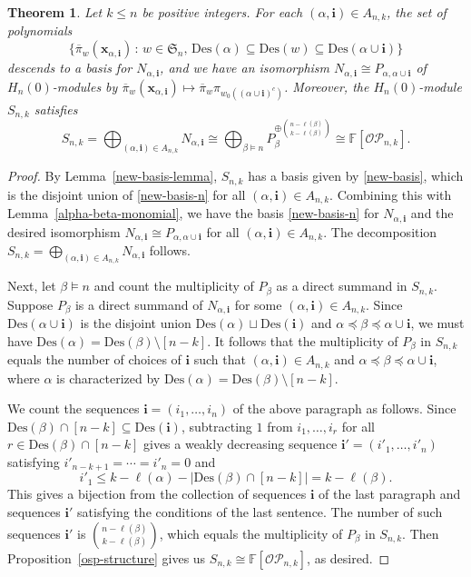 \documentclass[10pt]{amsart}
\newtheorem{theorem}{Theorem}[section]
\theoremstyle{definition}
\newcommand{\Des}{{\mathrm {Des}}}
\newcommand{\symm}{{\mathfrak{S}}}
\newcommand{\OP}{{\mathcal{OP}}}
\newcommand{\FF}{{\mathbb{F}}}
\newcommand{\xx}{{\mathbf {x}}}
\newcommand{\ii}{{\mathbf{i}}}
\newcommand{\pib}{\overline{\pi}}
\begin{document}
\begin{theorem}
\label{s-decomposition-theorem}
Let $k \leq n$ be positive integers. 
For each $(\alpha,\ii) \in A_{n,k}$, the set of polynomials 
\begin{equation}
\label{new-basis-n}
\{ \pib_w(\xx_{\alpha,\ii}) \,:\, w \in \symm_n, \, \Des(\alpha) \subseteq \Des(w) 
\subseteq \Des(\alpha \cup \ii) \}
\end{equation}
descends to a basis for $N_{\alpha,\ii}$, and we have an isomorphism $N_{\alpha,\ii} \cong P_{\alpha,\alpha \cup \ii}$ of $H_n(0)$-modules by $\pib_w(\xx_{\alpha,\ii}) \mapsto \pib_w\pi_{w_0((\alpha\cup\ii)^c)}$.
Moreover, the $H_n(0)$-module $S_{n,k}$ satisfies
\begin{equation}
S_{n,k} = \bigoplus_{(\alpha,\ii) \in A_{n,k}} N_{\alpha,\ii} 
\cong \bigoplus_{\beta \models n} P_{\beta}^{\oplus{n - \ell(\beta) \choose k - \ell(\beta)}} \cong \FF[\OP_{n,k}].
\end{equation}
\end{theorem}
\begin{proof}
By Lemma~\ref{new-basis-lemma}, $S_{n,k}$ has a basis given by \eqref{new-basis}, which is the disjoint union of \eqref{new-basis-n} for all $(\alpha, \ii) \in A_{n,k}$.
Combining this with Lemma~\ref{alpha-beta-monomial}, we have the basis \eqref{new-basis-n} for $N_{\alpha,\ii}$ and the desired isomorphism $N_{\alpha,\ii} \cong P_{\alpha,\alpha\cup\ii}$ for all $(\alpha, \ii) \in A_{n,k}$.
The decomposition $S_{n,k} = \bigoplus_{(\alpha,\ii) \in A_{n,k}} N_{\alpha,\ii}$ follows.

Next, let $\beta\models n$ and count the multiplicity of $P_{\beta}$ as a direct summand in $S_{n,k}$.
Suppose $P_{\beta}$ is a direct summand of $N_{\alpha,\ii}$ for some $(\alpha,\ii) \in A_{n,k}$.
Since $\Des(\alpha \cup \ii)$ is the disjoint union $\Des(\alpha) \sqcup \Des(\ii)$ and
$\alpha \preceq \beta \preceq \alpha \cup \ii$, we must have $\Des(\alpha) = \Des(\beta) \setminus [n-k]$.
It follows that the multiplicity of $P_{\beta}$ in $S_{n,k}$ equals the number of 
choices of $\ii$ such that $(\alpha,\ii) \in A_{n,k}$ and
$\alpha \preceq \beta \preceq \alpha \cup \ii$, where $\alpha$ is characterized by
$\Des(\alpha) = \Des(\beta) \setminus [n-k]$.

We count the sequences $\ii = (i_1, \dots, i_n)$ of the above paragraph as follows.
Since $\Des(\beta) \cap [n-k] \subseteq \Des(\ii)$,  subtracting $1$ from $i_1, \dots, i_r$ for all
$r \in \Des(\beta) \cap [n-k]$ gives a weakly decreasing sequence $\ii' = (i'_1, \dots, i'_n)$ satisfying
$i'_{n-k+1} = \cdots = i'_n = 0$ and
\begin{equation*}
i'_1 \leq k - \ell(\alpha) - |\Des(\beta) \cap [n-k]| = k - \ell(\beta).
\end{equation*}
This gives a bijection from the collection of sequences $\ii$ of the last paragraph and 
sequences $\ii'$ satisfying the conditions of the last sentence.    
The number of such sequences $\ii'$ is ${n - \ell(\beta) \choose k - \ell(\beta)}$, which equals the multiplicity of $P_\beta$ in $S_{n,k}$.
Then Proposition~\ref{osp-structure} gives us $S_{n,k} \cong \FF[\OP_{n,k}]$, as desired.
\end{proof}
\end{document}
